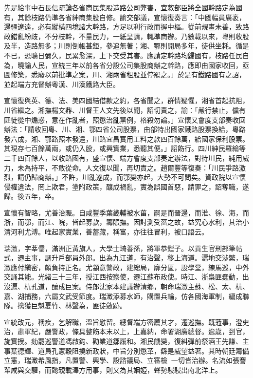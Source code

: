 \begin{pinyinscope}
先是給事中石長信疏論各省商民集股造路公司弊害，宜敕部臣將全國幹路定為國有，其餘枝路仍準各省紳商集股自修。諭交部議，宣懷復奏言：「中國幅員廣袤，邊疆遼遠，必有縱橫四境諸大幹路，方足以利行政而握中樞。從前規畫未善，致路政錯亂紛歧，不分枝幹，不量民力，一紙呈請，輒準商辦。乃數載以來，粵則收股及半，造路無多；川則倒帳甚鉅，參追無著；湘、鄂則開局多年，徒供坐耗。循是不已，恐曠日彌久，民累愈深，上下交受其害。應請定幹路均歸國有，枝路任民自為，曉諭人民，宣統三年以前各省分設公司集股商辦之幹路，應即由國家收回，亟圖修築，悉廢以前批準之案，川、湘兩省租股並停罷之。」於是有鐵路國有之詔，並起端方充督辦粵漢、川漢鐵路大臣。

宣懷復與英、德、法、美四國結借款之約，各省聞之，群情疑懼，湘省首起抗阻，川省繼之。湘撫楊文鼎、川督王人文先後以聞，詔切責之，諭：「嚴行禁止，儻有匪徒從中煽惑，意在作亂者，照懲治亂黨例，格殺勿論。」宣懷又會度支部奏收回辦法：「請收回粵、川、湘、鄂四省公司股票，由部特出國家鐵路股票換給，粵路發六成，湘、鄂路照本發還，川路宜昌實用工料之款四百餘萬，給國家保利股票。其現存七百餘萬兩，或仍入股，或興實業，悉聽其便。」詔飭行。四川紳民羅綸等二千四百餘人，以收路國有，盛宣懷、端方會度支部奏定辦法，對待川民，純用威力，未為持平，不敢從命。人文復以聞，再切責之。趙爾豐等復奏：「川民爭路激烈，請仍歸商辦。」不許，川亂遂成，而鄂變亦起，大勢不可問矣。資政院以宣懷侵權違法，罔上欺君，塗附政策，釀成禍亂，實為誤國首惡，請罪之，詔奪職，遂歸。後五年，卒。

宣懷有智略，尤善治賑。自咸豐季葉畿輔被水菑，嗣是而晉邊，而淮、徐、海，而浙，而鄂，而江、皖，皆起募款，籌賑撫。因討測受菑之故，益究心水利，其治小清河利尤溥。唯起家實業，善蓄藏，稱富，亦往往冒利，被口語云。

瑞澂，字莘儒，滿洲正黃旗人，大學士琦善孫，將軍恭鏜子。以貢生官刑部筆帖式，遷主事，調升戶部員外郎。出為九江道，有治聲，移上海道。滬地交涉繁，瑞澂應付縝密，頗負持正名。尤顓意警政，建總局，廓分區，設學堂，練馬巡，中外交誦其能。光緒三十三年，授江西按察使，遷江蘇布政使。時江、浙梟匪蠢動，出沒滬、杭孔道，釀成巨案。侍郎沈家本建議辦清鄉，朝命瑞澂主蘇、松、太、杭、嘉、湖捕務，六屬文武受節度。瑞澂添募水師，購置兵輪，仿各國海軍制，編成聯隊。擒獲巨魁夏竹、林聲為，匪徒斂跡。

宣統改元，稱疾，乞解職，溫旨慰留。總督端方密薦其才，遷巡撫。既蒞事，澄吏治，肅軍紀，嚴警政，條具整飭本末以上，上嘉納，命署湖廣總督。逾歲，到官，旋實授。劾罷巡警道馮啟鈞、勸業道鄒履和。湘民饑變，復糾彈前祭酒王先謙、主事葉德輝、道員孔憲穀阻撓新政狀，中旨分別懲革，繇是威望益著。其時朝廷籌備立憲，瑞澂希風指，凡置警、興學、設諮議局、立審檢，一切皆治辦。名流如張謇輩咸與交驩，而懿親載澤方用事，則又為其姻婭，聲勢駸駸出南北洋上。


\end{pinyinscope}
